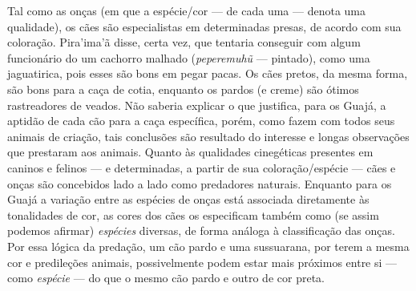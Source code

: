 Tal como as onças (em que a espécie/cor --- de cada uma --- denota uma
qualidade), os cães são especialistas em determinadas presas, de acordo
com sua coloração. Pira'ima'ã disse, certa vez, que tentaria conseguir
com algum funcionário do  um cachorro malhado (\emph{peperemuhũ} ---
pintado), como uma jaguatirica, pois esses são bons em pegar pacas. Os
cães pretos, da mesma forma, são bons para a caça de cotia, enquanto os
pardos (e creme) são ótimos rastreadores de veados. Não saberia explicar
o que justifica, para os Guajá, a aptidão de cada cão para a caça
específica, porém, como fazem com todos seus animais de criação, tais
conclusões são resultado do interesse e longas observações que prestaram
aos animais. Quanto às qualidades cinegéticas presentes em caninos e
felinos --- e determinadas, a partir de sua coloração/espécie --- cães e
onças são concebidos lado a lado como predadores naturais. Enquanto para
os Guajá a variação entre as espécies de onças está associada
diretamente às tonalidades de cor, as cores dos cães os especificam
também como (se assim podemos afirmar) \emph{espécies} diversas, de
forma análoga à classificação das onças. Por essa lógica da predação, um
cão pardo e uma sussuarana, por terem a mesma cor e predileções animais,
possivelmente podem estar mais próximos entre si --- como \emph{espécie} ---
do que o mesmo cão pardo e outro de cor preta.

